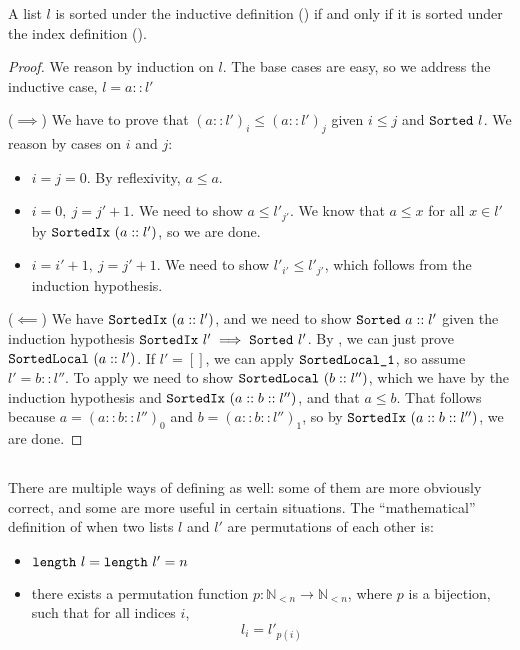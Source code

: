 \documentclass[11pt]{thesis}
\begin{document}
\begin{theorem}
  A list $l$ is sorted under the inductive definition () if
  and only if it is sorted under the index definition ().
\end{theorem}
\begin{proof}
  We reason by induction on $l$. The base cases are easy, so we
  address the inductive case, $l = a :: l'$

  ($\implies$) We have to prove that $(a :: l')_i \le (a :: l')_j$ given
  $i \le j$ and $\texttt{Sorted}~l$. We reason by cases on $i$ and $j$:
  \begin{itemize}[noitemsep]
  \item $i = j = 0$. By reflexivity, $a \le a$.
  \item $i = 0,~j=j' + 1$. We need to show $a \le l'_{j'}$. We know that
    $a \le x$ for all $x \in l'$ by $\texttt{SortedIx}~(a::l')$, so we are
    done.
  \item $i = i' +1,~j = j' + 1$. We need to show $l'_{i'} \le l'_{j'}$,
    which follows from the induction hypothesis.
  \end{itemize}

  ($\impliedby$) We have $\texttt{SortedIx}~(a :: l')$, and we need to
  show $\texttt{Sorted}~a :: l'$ given the induction hypothesis
  $\texttt{SortedIx}~l' \implies \texttt{Sorted}~l'$. By
  , we can just prove $\texttt{SortedLocal}~(a ::
  l')$. If $l' = []$, we can apply $\texttt{SortedLocal\_1}$, so assume
  $l' = b :: l''$. To apply  we need to show
  $\texttt{SortedLocal}~(b :: l'')$, which we have by the induction
  hypothesis and $\texttt{SortedIx}~(a :: b :: l'')$, and that $a \le b$.
  That follows because $a = (a :: b :: l'')_0$ and $b = (a :: b ::
  l'')_1$, so by $\texttt{SortedIx}~(a :: b :: l'')$, we are done.
\end{proof}

\subsection{}

There are multiple ways of defining  as well: some of
them are more obviously correct, and some are more useful in certain
situations. The ``mathematical'' definition of when two lists $l$
and $l'$ are permutations of each other is:
\begin{itemize}[nosep]
  \item $\texttt{length}~l = \texttt{length}~l' = n$
  \item there exists a permutation function $p : \mathbb{N}_{<n} \to
    \mathbb{N}_{<n}$, where $p$ is a bijection, such that for all indices $i$,
    \begin{equation*}
      l_i = l'_{p(i)}
    \end{equation*}
\end{itemize}
\end{document}

